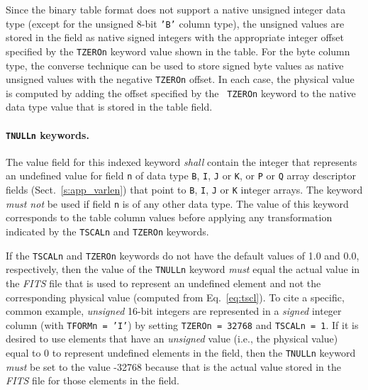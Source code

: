 \documentclass[onecolumn]{aa}
\begin{document}
 Since the binary table
 format does not support a native unsigned integer data
 type (except for the unsigned 8-bit {\tt 'B'} column type), 
 the unsigned values are stored in the field as
 native signed integers with the appropriate integer offset specified by
 the {\tt TZEROn} keyword value shown in the table. 
 For the byte column type, the converse technique can be used to
 store signed byte values as native unsigned values with the negative
 {\tt TZEROn} offset.  
 In each case, the physical value
 is computed by adding the offset specified by the {\tt
 TZEROn} keyword to the native data type value that is stored in the
 table field.  

    \paragraph{{\tt TNULLn} keywords.}
 The value field for this indexed keyword {\em shall} contain 
 the integer that represents 
 an undefined value for field {\tt n} of data type 
 {\tt B}, {\tt I}, {\tt J} or {\tt K},
 or {\tt P} or {\tt Q} array descriptor fields (Sect.\ \ref{s:app_varlen}) that 
 point to {\tt B}, {\tt I}, {\tt J} or {\tt K} integer arrays.
 The keyword {\em must not} be used if field {\tt n} is 
 of any other data type. 
 The value of this keyword corresponds to the table column values before 
 applying any transformation indicated by the {\tt TSCALn} and {\tt TZEROn}
 keywords.

   If the {\tt TSCALn} and {\tt TZEROn} keywords do not have the
 default values of 1.0 and 0.0, respectively, then the value of the
 {\tt TNULLn} keyword {\em must} equal the actual value in the 
 {\em FITS\/} file that is used to represent an undefined element
 and not the corresponding physical value (computed from 
 Eq.~\ref{eq:tscl}).  To cite a specific, common example,  {\em
 unsigned} 16-bit integers are represented in a {\em signed}
 integer column (with {\tt TFORMn = 'I'}) by setting 
 {\tt TZEROn = 32768} and {\tt TSCALn = 1}.  If it is desired  to
 use elements that have an {\em unsigned} value (i.e., the physical
 value) equal to 0 to represent  undefined elements in the field,
 then the {\tt TNULLn}  keyword {\em must} be set to the value
 -32768   because that is the actual value stored in the {\em FITS}
 file for those elements in the field. 
 
\end{document}
